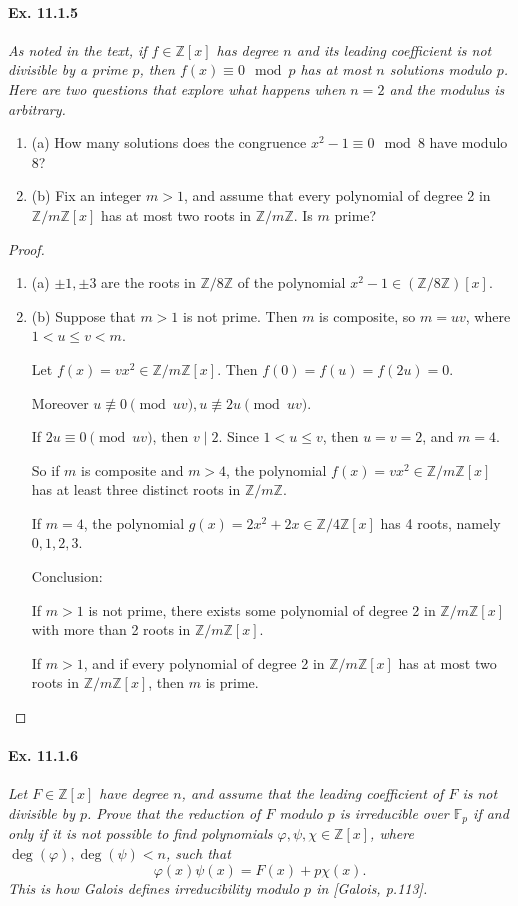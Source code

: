 \documentclass[11pt,a4paper]{article}
\newcommand{\be} {\begin{enumerate}}
\newcommand{\ee} {\end{enumerate}}
\newcommand{\Z}{\mathbb{Z}}
\newcommand{\F}{\mathbb{F}}
\begin{document}
\paragraph{Ex. 11.1.5}

{\it As noted in the text, if $f\in \Z[x]$ has degree $n$ and its leading coefficient is not divisible by a prime $p$, then $f(x) \equiv 0 \mod p$ has at most $n$ solutions modulo $p$. Here are two questions that explore what happens when $n=2$ and the modulus is arbitrary.
\be
\item[(a)] How many solutions does the congruence $x^2 - 1 \equiv 0 \mod 8$ have modulo 8?
\item[(b)] Fix an integer $m>1$, and assume that every polynomial of degree 2 in $\Z/m\Z[x]$ has at most two roots in $\Z/m\Z$. Is $m$ prime?
\ee
}

\begin{proof}
\be
\item[(a)]
$\pm1,\pm3$ are the roots in $\Z/8\Z$ of the polynomial $x^2-1 \in (\Z/8\Z)[x]$.
\item[(b)] Suppose that $m>1$ is not prime. Then $m$ is composite, so $m = uv$, where $1<u\leq v<m$.

Let $f(x) = vx^2 \in\Z/m\Z[x]$. Then $f(0) = f(u) = f(2u)=0$.

Moreover $u \not \equiv 0 \pmod {uv}, u \not \equiv 2u  \pmod {uv}$.

If $2u \equiv 0 \pmod {uv}$, then $v \mid 2$. Since $1<u\leq v$, then $u=v=2$, and $m=4$.

So if $m$ is composite and $m>4$, the polynomial $f(x) = vx^2 \in\Z/m\Z[x]$ has at least three distinct roots in $\Z/m\Z$.

If $m = 4$, the polynomial $g(x) = 2x^2+2x \in \Z/4\Z[x]$ has 4 roots, namely $0,1,2,3$.
	
Conclusion:

If $m>1$ is not prime, there exists some polynomial of degree 2 in $\Z/m\Z[x]$ with more than 2 roots in $\Z/m\Z[x]$.

If $m>1$, and if every polynomial of degree 2 in $\Z/m\Z[x]$ has at most two roots in $\Z/m\Z[x]$, then $m$ is prime.			
\ee
\end{proof}

\paragraph{Ex. 11.1.6}

{\it Let $F\in\Z[x]$ have degree $n$, and assume that the leading coefficient of $F$ is not divisible by $p$. Prove that the reduction of $F$ modulo $p$ is irreducible over $\F_p$ if and only if it is not possible to find polynomials $\varphi,\psi,\chi \in \Z[x]$, where $\deg(\varphi),\deg(\psi) < n$, such that
$$\varphi(x) \psi(x) = F(x) + p \chi(x).$$
This is how Galois defines irreducibility modulo $p$ in [Galois, p.113].
}
\end{document}
